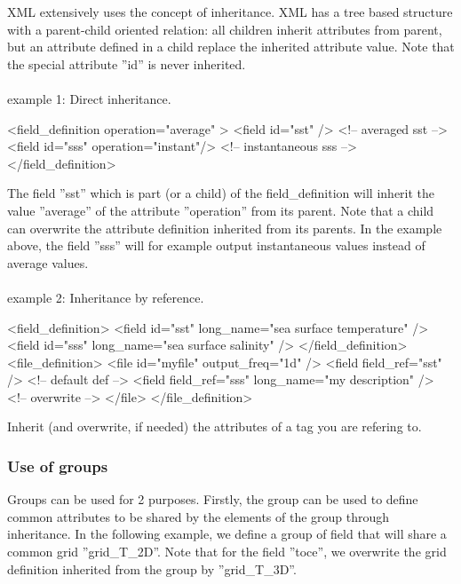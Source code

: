 \documentclass[../tex_main/NEMO_manual]{subfiles}
\begin{document}
XML extensively uses the concept of inheritance.
XML has a tree based structure with a parent-child oriented relation: all children inherit attributes from parent,
but an attribute defined in a child replace the inherited attribute value.
Note that the special attribute ''id'' is never inherited.
\\
\\
example 1: Direct inheritance.

\begin{xmllines}
<field_definition operation="average" >
	<field id="sst"                    />   <!-- averaged      sst --> 
	<field id="sss" operation="instant"/>   <!-- instantaneous sss --> 
</field_definition> 
\end{xmllines}

The field ''sst'' which is part (or a child) of the field\_definition will inherit the value ''average'' of
the attribute ''operation'' from its parent.
Note that a child can overwrite the attribute definition inherited from its parents.
In the example above, the field ''sss'' will for example output instantaneous values instead of average values.
\\
\\
example 2: Inheritance by reference.

\begin{xmllines}
<field_definition>
	<field id="sst" long_name="sea surface temperature" />
	<field id="sss" long_name="sea surface salinity"    />
</field_definition>
<file_definition>
	<file id="myfile" output_freq="1d" />   
		<field field_ref="sst"                            />  <!-- default def -->
		<field field_ref="sss" long_name="my description" />  <!-- overwrite   -->
	</file>
</file_definition> 
\end{xmllines}

Inherit (and overwrite, if needed) the attributes of a tag you are refering to.

\subsubsection{Use of groups}

Groups can be used for 2 purposes.
Firstly, the group can be used to define common attributes to be shared by the elements of
the group through inheritance.
In the following example, we define a group of field that will share a common grid ''grid\_T\_2D''.
Note that for the field ''toce'', we overwrite the grid definition inherited from the group by ''grid\_T\_3D''.
\end{document}
